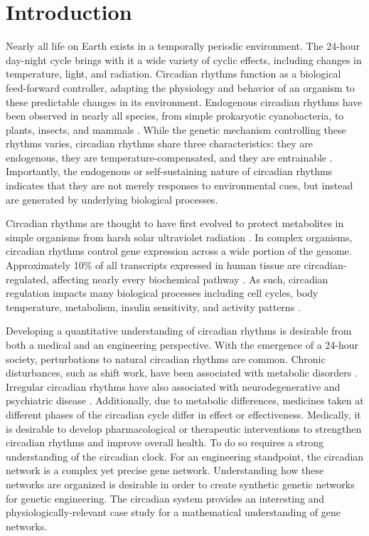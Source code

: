 \chapter{Introduction}

Nearly all life on Earth exists in a temporally periodic environment.
The 24-hour day-night cycle brings with it a wide variety of cyclic effects, including changes in temperature, light, and radiation.
Circadian rhythms function as a biological feed-forward controller, adapting the physiology and behavior of an organism to these predictable changes in its environment.
Endogenous circadian rhythms have been observed in nearly all species, from simple prokaryotic cyanobacteria, to plants, insects, and mammals \cite{Ishiura1998, McClung2006a, Glossop1999, Ko2006}.
While the genetic mechanism controlling these rhythms varies, circadian rhythms share three characteristics: they are endogenous, they are temperature-compensated, and they are entrainable \cite{Dunlap2004}.
Importantly, the endogenous or self-sustaining nature of circadian rhythms indicates that they are not merely responses to environmental cues, but instead are generated by underlying biological processes.

Circadian rhythms are thought to have first evolved to protect metabolites in simple organisms from harsh solar ultraviolet radiation \cite{Nikaido2000}.
In complex organisms, circadian rhythms control gene expression across a wide portion of the genome.
Approximately 10\% of all transcripts expressed in human tissue are circadian-regulated, affecting nearly every biochemical pathway \cite{Lowrey2004}.
As such, circadian regulation impacts many biological processes including cell cycles, body temperature, metabolism, insulin sensitivity, and activity patterns \cite{Refinetti1992, Bieler2014, Sassone-Corsi1998, Bass2010}.

Developing a quantitative understanding of circadian rhythms is desirable from both a medical and an engineering perspective.
With the emergence of a 24-hour society, perturbations to natural circadian rhythms are common.
Chronic disturbances, such as shift work, have been associated with metabolic disorders \cite{Haus2006}.
Irregular circadian rhythms have also associated with neurodegenerative and psychiatric disease \cite{Wulff2010}.
Additionally, due to metabolic differences, medicines taken at different phases of the circadian cycle differ in effect or effectiveness.
Medically, it is desirable to develop pharmacological or therapeutic interventions to strengthen circadian rhythms and improve overall health.
To do so requires a strong understanding of the circadian clock.
For an engineering standpoint, the circadian network is a complex yet precise gene network.
Understanding how these networks are organized is desirable in order to create synthetic genetic networks for genetic engineering.
The circadian system provides an interesting and physiologically-relevant case study for a mathematical understanding of gene networks.

